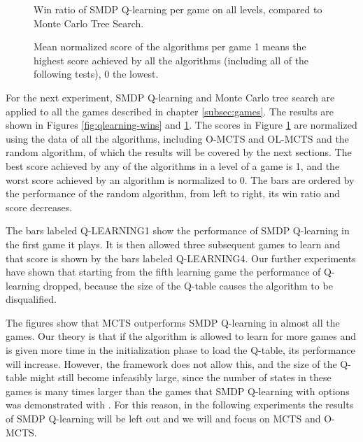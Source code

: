 \begin{figure}
	\centering
	\vspace{-.8cm}
	\caption{Win ratio of SMDP Q-learning per game on all levels, compared to Monte Carlo Tree Search.}
	\label{fig:qlearning-wins}
	\centering
	\vspace{-.8cm}
	\caption{Mean normalized score of the algorithms per game 1 means the
	highest score achieved by all the algorithms (including all of the following
tests), 0 the lowest.}
	\label{fig:qlearning-scores}
\end{figure}

For the next experiment, SMDP Q-learning and Monte Carlo tree search are applied
to all the games described in chapter \ref{subsec:games}. The results are shown
in Figures \ref{fig:qlearning-wins} and \ref{fig:qlearning-scores}. The scores
in Figure \ref{fig:qlearning-scores} are normalized using the data of all the
algorithms, including O-MCTS and OL-MCTS and the random algorithm, of which the
results will be covered by the next sections. The best score achieved by any of
the algorithms in a level of a game is 1, and the worst score achieved by an
algorithm is normalized to 0. The bars are ordered by the performance of the
random algorithm, from left to right, its win ratio and score decreases. 

The bars labeled Q-LEARNING1 show the performance of SMDP Q-learning in
the first game it plays. It is then allowed three subsequent games to learn and
that score is shown by the bars labeled Q-LEARNING4. Our further
experiments have shown that starting from the fifth learning game the
performance of Q-learning dropped, because the size of the Q-table causes the
algorithm to be disqualified. 

The figures show that MCTS outperforms SMDP Q-learning in almost all the games.
Our theory is that if the algorithm is allowed to learn for more games and is
given more time in the initialization phase to load the Q-table, its performance
will increase. However, the framework does not allow this, and the size of the
Q-table might still become infeasibly large, since the number of states in these
games is many times larger than the games that SMDP Q-learning with options was
demonstrated with \cite{sutton1999between}. For this reason, in the following
experiments the results of SMDP Q-learning will be left out and we will and
focus on MCTS and O-MCTS.

